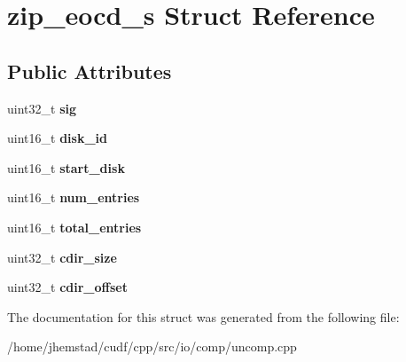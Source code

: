 \hypertarget{structzip__eocd__s}{}\section{zip\+\_\+eocd\+\_\+s Struct Reference}
\label{structzip__eocd__s}
\subsection*{Public Attributes}
\begin{DoxyCompactItemize}
\item 
uint32\+\_\+t {\bfseries sig}\hypertarget{structzip__eocd__s_afe88caff5251d538234b56bfce8bb13c}{}\label{structzip__eocd__s_afe88caff5251d538234b56bfce8bb13c}

\item 
uint16\+\_\+t {\bfseries disk\+\_\+id}\hypertarget{structzip__eocd__s_af279ca6f2e1ab149cedddce5946002f0}{}\label{structzip__eocd__s_af279ca6f2e1ab149cedddce5946002f0}

\item 
uint16\+\_\+t {\bfseries start\+\_\+disk}\hypertarget{structzip__eocd__s_ad214271dc1111e047ca5ad766a8b740b}{}\label{structzip__eocd__s_ad214271dc1111e047ca5ad766a8b740b}

\item 
uint16\+\_\+t {\bfseries num\+\_\+entries}\hypertarget{structzip__eocd__s_a1895c43af59115624bd21eaab269e18f}{}\label{structzip__eocd__s_a1895c43af59115624bd21eaab269e18f}

\item 
uint16\+\_\+t {\bfseries total\+\_\+entries}\hypertarget{structzip__eocd__s_a844d8c252ebbb46f8521096f7f24a6e6}{}\label{structzip__eocd__s_a844d8c252ebbb46f8521096f7f24a6e6}

\item 
uint32\+\_\+t {\bfseries cdir\+\_\+size}\hypertarget{structzip__eocd__s_ad2795a850478d92a3f5c95bb036c0d79}{}\label{structzip__eocd__s_ad2795a850478d92a3f5c95bb036c0d79}

\item 
uint32\+\_\+t {\bfseries cdir\+\_\+offset}\hypertarget{structzip__eocd__s_ad34e9e7d3e5e6da2cec5f27c333e92eb}{}\label{structzip__eocd__s_ad34e9e7d3e5e6da2cec5f27c333e92eb}

\end{DoxyCompactItemize}


The documentation for this struct was generated from the following file\+:\begin{DoxyCompactItemize}
\item 
/home/jhemstad/cudf/cpp/src/io/comp/uncomp.\+cpp\end{DoxyCompactItemize}
